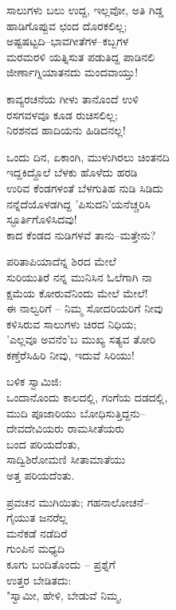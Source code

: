 \begin{myquote}
ಸಾಲುಗಳು ಬಲು ಉದ್ದ, ಇಲ್ಲವೋ, ಅತಿ ಗಿಡ್ಡ\\ಹಾಡಿಗೊಪ್ಪುವ ಛಂದ ದೊರಕಲಿಲ್ಲ;\\ಅಷ್ಟಷಟ್ಟದಿ–ಭಾವಗೀತೆಗಳ–ಕಬ್ಬಗಳ\\ಮರಮರಳಿ ಯತ್ನಿಸುತ ಪಡುತಿದ್ದ ಪಾಡಿನಲಿ\\ಜೀರ್ಣಾಗ್ನಿಯಾತನದು ಮಂದವಾಯ್ತು!
\end{myquote}

\begin{myquote}
ಕಾವ್ಯರಚನೆಯ ಗೀಳು ತಾನೊಂದೆ ಉಳಿ\\ರಸಗವಳವೂ ಕೂಡ ರುಚಿಸಲಿಲ್ಲ;\\ನಿರಶನದ ಹಾದಿಯನು ಹಿಡಿದನಲ್ಲ!
\end{myquote}

\begin{myquote}
ಒಂದು ದಿನ, ಏಕಾಂಗಿ, ಮುಳುಗಿರಲು ಚಿಂತನದಿ\\ಇದ್ದಕಿದ್ದೊಲೆ ಬೆಳಕು ಹೊಳೆದು ಹರಡಿ\\ಉರಿವ ಕೆಂಡಗಳಂತೆ ಬೆಳಗುತಿಹ ನುಡಿ ಸಿಡಿದು\\ನನ್ನೆದೆಯೊಳಡಗಿದ್ದ 'ಪಿಸುದನಿ'ಯನೆಚ್ಚರಿಸಿ\\ಸ್ಫೂರ್ತಿಗೊಳಿಸಿದವು!\\ಕಾದ ಕೆಂಡದ ನುಡಿಗಳವೆ ತಾನು–ಮತ್ತೇನು?
\end{myquote}

\begin{myquote}
ಪರಿತಾಪಿಯಾದೆನ್ನ ಶಿರದ ಮೇಲೆ\\ಸುರಿಯುತಿರೆ ನನ್ನ ಮುನಿಸಿನ ಓಲೆಗಾಗಿ ನಾ\\ಕ್ಷಮೆಯ ಕೋರುವೆನಿಂದು ಮೇಲೆ ಮೇಲೆ!\\ಈ ನಾಲ್ವರಿಗೆ – ನಿಮ್ಮ ಸೋದರಿಯರಿಗೆ ನೀವು\\ಕಳಿಸಿರುವ ಸಾಲುಗಳು ಚಿರದ ನಿಧಿಯ;\\'ಎಲ್ಲವೂ ಅವನೆಂ'ಬ ಮುಖ್ಯ ಸತ್ಯವ ತೋರಿ\\ಕಣ್ತೆರೆಸಿಹಿರಿ ನೀವು, ಇದುವೆ ಸಿರಿಯು!
\end{myquote}

\begin{myquote}
ಬಳಿಕ ಸ್ವಾಮಿಜಿ:\\ಒಂದಾನೊಂದು ಕಾಲದಲ್ಲಿ, ಗಂಗೆಯ ದಡದಲ್ಲಿ,\\ಮುದಿ ಪೂಜಾರಿಯು ಬೋಧಿಸುತ್ತಿದ್ದನು–\\ದೇವದೇವಿಯರು ರಾಮಸೀತೆಯರು\\ಬಂದ ಪರಿಯದೆಂತು,\\ಸಾದ್ವಿಶಿರೋಮಣಿ ಸೀತಾಮಾತೆಯು\\ಅತ್ತ ಪರಿಯದೆಂತು.
\end{myquote}

\begin{myquote}
ಪ್ರವಚನ ಮುಗಿಯಿತು; ಗಹನಾಲೋಚನೆ–\\ಗೈಯುತ ಜನರೆಲ್ಲ\\ಮನೆಕಡೆ ನಡೆದಿರೆ\\ಗುಂಪಿನ ಮಧ್ಯದಿ\\ಕೂಗು ಬಂದಿತೊಂದು – ಪ್ರಶ್ನೆಗೆ\\ಉತ್ತರ ಬೇಡಿತದು:\\"ಸ್ವಾಮೀ, ಹೇಳಿ, ಬೇಡುವೆ ನಿಮ್ಮ,
\end{myquote}


